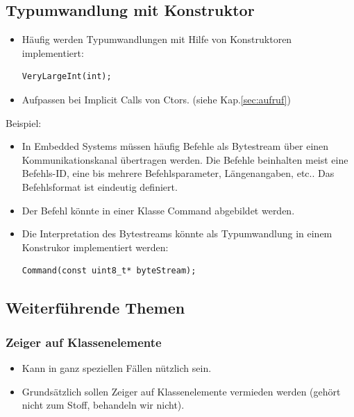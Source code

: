 \subsection{Typumwandlung mit Konstruktor}
\begin{itemize}
	\item Häufig werden Typumwandlungen mit Hilfe von Konstruktoren implementiert:\\
	\vspace{-\baselineskip}
	\begin{minipage}{0.3\linewidth}
\begin{lstlisting}
VeryLargeInt(int);
\end{lstlisting}
	\end{minipage}
	\item[\-] \begin{achtung}
		  Aufpassen bei Implicit Calls von Ctors. (siehe Kap.\ref{sec:aufruf})
		  \end{achtung}
\end{itemize}
Beispiel:
\begin{itemize}
	\item In Embedded Systems müssen häufig Befehle als Bytestream über einen Kommunikationskanal übertragen werden. Die Befehle beinhalten meist eine Befehls-ID, eine bis mehrere Befehlsparameter, Längenangaben, etc.. Das Befehlsformat ist eindeutig definiert.
	\item Der Befehl könnte in einer Klasse Command abgebildet werden.
	\item Die Interpretation des Bytestreams könnte als Typumwandlung in einem Konstrukor implementiert werden:\\
	\vspace{-\baselineskip}
	\begin{minipage}{0.45\linewidth}
\begin{lstlisting}
Command(const uint8_t* byteStream);
\end{lstlisting}
	\end{minipage}
\end{itemize}

\subsection{Weiterführende Themen}

\subsubsection{Zeiger auf Klassenelemente}
\begin{itemize}
	\item Kann in ganz speziellen Fällen nützlich sein.
	\item Grundsätzlich sollen Zeiger auf Klassenelemente vermieden werden (gehört nicht zum Stoff, behandeln wir nicht).
\end{itemize}

